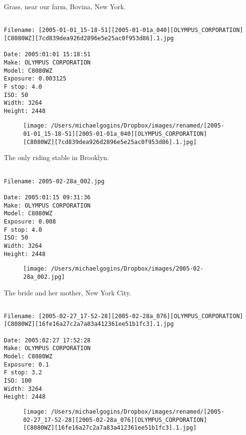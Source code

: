 \documentclass[11pt,letter,DIV=14,paper=landscape]{scrbook}
\begin{document}
\clearpage
\noindent Grass, near our farm, Bovina, New York.
\noindent
\begin{lstlisting}

Filename: [2005-01-01_15-18-51][2005-01-01a_040][OLYMPUS_CORPORATION][C8080WZ][7cd839dea926d2896e5e25ac0f953d86].1.jpg

Date: 2005:01:01 15:18:51
Make: OLYMPUS CORPORATION
Model: C8080WZ
Exposure: 0.003125
F stop: 4.0
ISO: 50
Width: 3264
Height: 2448
\end{lstlisting}
\clearpage

\begin{figure}
\texttt{[image: /Users/michaelgogins/Dropbox/images/renamed/[2005-01-01\_15-18-51][2005-01-01a\_040][OLYMPUS\_CORPORATION][C8080WZ][7cd839dea926d2896e5e25ac0f953d86].1.jpg]}
\end{figure}
    
\clearpage
\noindent The only riding stable in Brooklyn.
\noindent
\begin{lstlisting}

Filename: 2005-02-28a_002.jpg

Date: 2005:01:15 09:31:36
Make: OLYMPUS CORPORATION
Model: C8080WZ
Exposure: 0.008
F stop: 4.0
ISO: 50
Width: 3264
Height: 2448
\end{lstlisting}
\clearpage

\begin{figure}
\texttt{[image: /Users/michaelgogins/Dropbox/images/2005-02-28a\_002.jpg]}
\end{figure}
    
\clearpage
\noindent The bride and her mother, New York City.
\noindent
\begin{lstlisting}

Filename: [2005-02-27_17-52-28][2005-02-28a_076][OLYMPUS_CORPORATION][C8080WZ][16fe16a27c2a7a83a412361ee51b1fc3].1.jpg

Date: 2005:02:27 17:52:28
Make: OLYMPUS CORPORATION
Model: C8080WZ
Exposure: 0.1
F stop: 3.2
ISO: 100
Width: 3264
Height: 2448
\end{lstlisting}
\clearpage

\begin{figure}
\texttt{[image: /Users/michaelgogins/Dropbox/images/renamed/[2005-02-27\_17-52-28][2005-02-28a\_076][OLYMPUS\_CORPORATION][C8080WZ][16fe16a27c2a7a83a412361ee51b1fc3].1.jpg]}
\end{figure}
    
\end{document}
